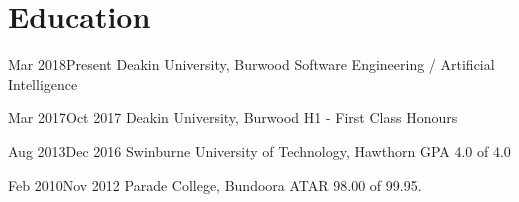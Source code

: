 \section{Education}

\begin{multicols}{2}

{Mar 2018}{Present}
{Deakin University, Burwood}
{Software Engineering / Artificial Intelligence}

{Mar 2017}{Oct 2017}
{Deakin University, Burwood}
{H1 - First Class Honours}

\columnbreak

{Aug 2013}{Dec 2016}
{Swinburne University of Technology, Hawthorn}
{GPA 4.0 of 4.0}

{Feb 2010}{Nov 2012}
{Parade College, Bundoora}
{ATAR 98.00 of 99.95.}

\end{multicols}